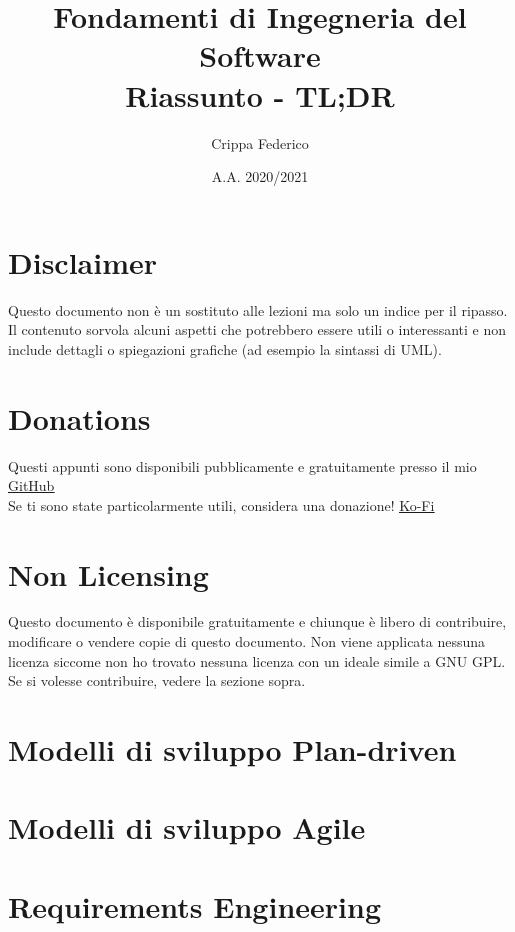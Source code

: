 \documentclass[10pt]{article}
\title{Fondamenti di Ingegneria del Software\\ \large Riassunto - TL;DR}
\author{Crippa Federico}
\date{A.A. 2020/2021}
\begin{document}
\maketitle
\tableofcontents

\newpage
\section*{Disclaimer}
Questo documento non \`e un sostituto alle lezioni ma solo un indice per il ripasso. Il contenuto sorvola alcuni aspetti che potrebbero essere utili o interessanti e non include dettagli o spiegazioni grafiche (ad esempio la sintassi di UML).

\vspace{1in}
\section*{Donations} \label{sec:Donations}
Questi appunti sono disponibili pubblicamente e gratuitamente presso il mio \underline{\href{https://github.com/WolfenCLI/Fondamenti-Ingegneria-Software}{GitHub}}\\
Se ti sono state particolarmente utili, considera una donazione! \underline{\href{https://ko-fi.com/wolfencli}{Ko-Fi}}

\vspace{1in}
\section*{Non Licensing}
Questo documento \`e disponibile gratuitamente e chiunque \`e libero di contribuire, modificare o vendere copie di questo documento. Non viene applicata nessuna licenza siccome non ho trovato nessuna licenza con un ideale simile a GNU GPL.\\
Se si volesse contribuire, vedere la sezione sopra.

\newpage
\section{Modelli di sviluppo Plan-driven}


\section{Modelli di sviluppo Agile}


\newpage
\section{Requirements Engineering}

\end{document}
